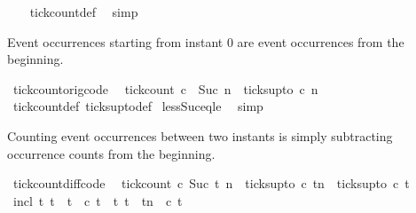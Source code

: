 \begin{isabellebody}
%
\isadelimproof
\ \ %
\endisadelimproof
%
\isatagproof
{}\isamarkupfalse%
\ tick{\isacharunderscore}count{\isacharunderscore}def\ \isamarkupfalse%
\ simp%
\endisatagproof
{\isafoldproof}%
%
\isadelimproof
%
\endisadelimproof
%
\begin{isamarkuptext}%
Event occurrences starting from instant 0 are event occurrences from the beginning.%
\end{isamarkuptext}\isamarkuptrue%
\isamarkupfalse%
\ tick{\isacharunderscore}count{\isacharunderscore}orig{\isacharbrackleft}code{\isacharbrackright}{\isacharcolon}\isanewline
\ \ {\isacartoucheopen}tick{\isacharunderscore}count\ c\ {}\ {\isacharparenleft}Suc\ n{\isacharparenright}\ {\isacharequal}\ ticks{\isacharunderscore}up{\isacharunderscore}to\ c\ n{\isacartoucheclose}\isanewline
%
\isadelimproof
%
\endisadelimproof
%
\isatagproof
{}\isamarkupfalse%
\ tick{\isacharunderscore}count{\isacharunderscore}def\ ticks{\isacharunderscore}up{\isacharunderscore}to{\isacharunderscore}def\isanewline
{}\isamarkupfalse%
\ less{\isacharunderscore}Suc{\isacharunderscore}eq{\isacharunderscore}le\ \isamarkupfalse%
\ simp%
\endisatagproof
{\isafoldproof}%
%
\isadelimproof
%
\endisadelimproof
%
\begin{isamarkuptext}%
Counting event occurrences between two instants is simply subtracting
occurrence counts from the beginning.%
\end{isamarkuptext}\isamarkuptrue%
\isamarkupfalse%
\ tick{\isacharunderscore}count{\isacharunderscore}diff{\isacharbrackleft}code{\isacharbrackright}{\isacharcolon}\isanewline
\ \ {\isacartoucheopen}tick{\isacharunderscore}count\ c\ {\isacharparenleft}Suc\ t\ n\ {\isacharequal}\ {\isacharparenleft}ticks{\isacharunderscore}up{\isacharunderscore}to\ c\ {\isacharparenleft}tn{\isacharparenright}{\isacharparenright}\ {\isacharminus}\ {\isacharparenleft}ticks{\isacharunderscore}up{\isacharunderscore}to\ c\ t\isanewline
%
\isadelimproof
%
\endisadelimproof
%
\isatagproof
{}\isamarkupfalse%
\ {\isacharminus}\isanewline
\ \ \isamarkupfalse%
\ incl{\isacharcolon}\ {\isacartoucheopen}{\isacharbraceleft}t{\isachardot}\ t\ {\isasymle}\ t\ {\isasymand}\ c\ t{\isacharbraceright}\ {\isasymsubseteq}\ {\isacharbraceleft}t{\isachardot}\ t\ {\isasymle}\ tn\ {\isasymand}\ c\ t{\isacharbraceright}{\isacartoucheclose}\ \isamarkupfalse%

\end{isabellebody}
